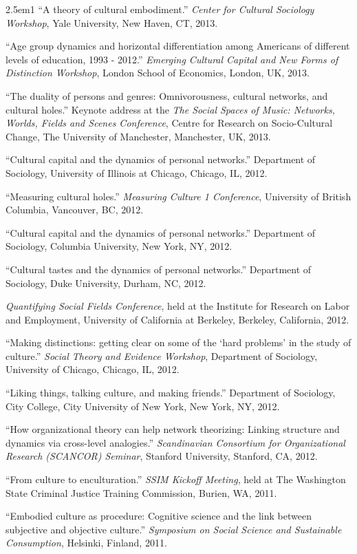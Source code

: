 \documentclass[
]{article}
\newenvironment{cventry}{\begin{hangparas}{2.5em}{1}}{\end{hangparas}}
\begin{document}
\begin{cventry}
``A theory of cultural embodiment.'' \emph{Center for Cultural Sociology
Workshop}, Yale University, New Haven, CT, 2013.

``Age group dynamics and horizontal differentiation among Americans of
different levels of education, 1993 - 2012.'' \emph{Emerging Cultural
Capital and New Forms of Distinction Workshop}, London School of
Economics, London, UK, 2013.

``The duality of persons and genres: Omnivorousness, cultural networks,
and cultural holes.'' Keynote address at the \emph{The Social Spaces of
Music: Networks, Worlds, Fields and Scenes Conference}, Centre for
Research on Socio-Cultural Change, The University of Manchester,
Manchester, UK, 2013.

``Cultural capital and the dynamics of personal networks.'' Department
of Sociology, University of Illinois at Chicago, Chicago, IL, 2012.

``Measuring cultural holes.'' \emph{Measuring Culture 1 Conference},
University of British Columbia, Vancouver, BC, 2012.

``Cultural capital and the dynamics of personal networks.'' Department
of Sociology, Columbia University, New York, NY, 2012.

``Cultural tastes and the dynamics of personal networks.'' Department of
Sociology, Duke University, Durham, NC, 2012.

\emph{Quantifying Social Fields Conference}, held at the Institute for
Research on Labor and Employment, University of California at Berkeley,
Berkeley, California, 2012.

``Making distinctions: getting clear on some of the `hard problems' in
the study of culture.'' \emph{Social Theory and Evidence Workshop},
Department of Sociology, University of Chicago, Chicago, IL, 2012.

``Liking things, talking culture, and making friends.'' Department of
Sociology, City College, City University of New York, New York, NY,
2012.

``How organizational theory can help network theorizing: Linking
structure and dynamics via cross-level analogies.'' \emph{Scandinavian
Consortium for Organizational Research (SCANCOR) Seminar}, Stanford
University, Stanford, CA, 2012.

``From culture to enculturation.'' \emph{SSIM Kickoff Meeting}, held at
The Washington State Criminal Justice Training Commission, Burien, WA,
2011.

``Embodied culture as procedure: Cognitive science and the link between
subjective and objective culture.'' \emph{Symposium on Social Science
and Sustainable Consumption}, Helsinki, Finland, 2011.


\end{cventry}
\end{document}
